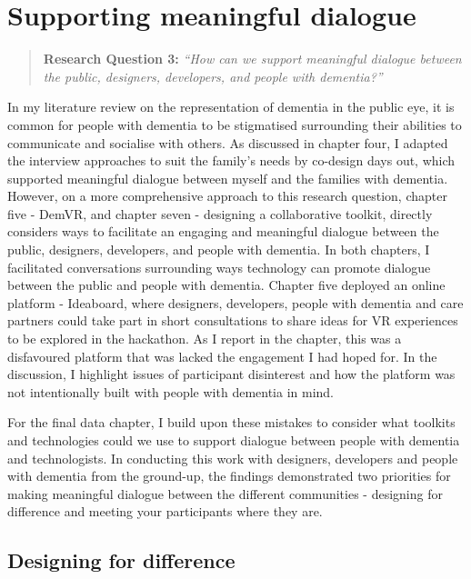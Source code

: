 \section{Supporting meaningful dialogue}
\label{Discussion:RQ3}
\begin{quote}
\textbf{    Research Question 3:
}    
\textit{    “How can we support meaningful dialogue between the public, designers, developers, and people with dementia?”}
\end{quote}
In my literature review on the representation of dementia in the public eye, it is common for people with dementia to be stigmatised surrounding their abilities to communicate and socialise with others. As discussed in chapter four, I adapted the interview approaches to suit the family's needs by co-design days out, which supported meaningful dialogue between myself and the families with dementia. However, on a more comprehensive approach to this research question, chapter five - DemVR, and chapter seven - designing a collaborative toolkit, directly considers ways to facilitate an engaging and meaningful dialogue between the public, designers, developers, and people with dementia. In both chapters, I facilitated conversations surrounding ways technology can promote dialogue between the public and people with dementia. Chapter five deployed an online platform - Ideaboard, where designers, developers, people with dementia and care partners could take part in short consultations to share ideas for VR experiences to be explored in the hackathon. As I report in the chapter, this was a disfavoured platform that was lacked the engagement I had hoped for. In the discussion, I highlight issues of participant disinterest and how the platform was not intentionally built with people with dementia in mind. 

For the final data chapter, I build upon these mistakes to consider what toolkits and technologies could we use to support dialogue between people with dementia and technologists. In conducting this work with designers, developers and people with dementia from the ground-up, the findings demonstrated two priorities for making meaningful dialogue between the different communities - designing for difference and meeting your participants where they are.

\subsection{Designing for difference}
\label{Discussion:Design4Difference}

